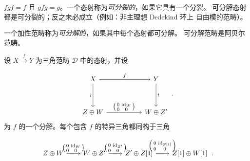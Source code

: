 \clearpage
{}%
\begingroup
\small
\setlength{\abovedisplayskip}{4pt plus 2pt minus 2pt}%
\setlength{\belowdisplayskip}{4pt plus 2pt minus 2pt}%

$fgf=f$ 且 $gfg=g$。一个态射称为\emph{可分裂的}，如果它具有一个分裂。
可分解态射都是可分裂的；反之未必成立（例如：非主理想 Dedekind 环上
自由模的范畴）。

一个加性范畴称为\emph{可分解的}，如果其中每个态射都可分解。
可分解范畴是阿贝尔范畴。

设 $X\xrightarrow{f}Y$ 为三角范畴 $\mathcal D$ 中的态射，并设

\begin{equation*}
  \begin{tikzcd}[ampersand replacement=\&,column sep=5.2em,row sep=3.4em]
    X \arrow[r,"f"] \arrow[d,"\wr"']
      \& Y \arrow[d,"\wr"] \\
    Z\oplus W
      \arrow[r,"{\left(\begin{smallmatrix}0&\operatorname{id}_W\\0&0\end{smallmatrix}\right)}"]
      \& W\oplus Z'
  \end{tikzcd}\,.
\end{equation*}
为 $f$ 的一个分解。每个包含 $f$ 的特异三角都同构于三角

\begin{equation*}
  \begin{tikzcd}[ampersand replacement=\&,column sep=2.0em]
    Z\oplus W
      \arrow[r,"{\left(\begin{smallmatrix}0&\operatorname{id}_W\\0&0\end{smallmatrix}\right)}"]
      \& W\oplus Z'
      \arrow[r,"{\left(\begin{smallmatrix}0&\operatorname{id}_{Z'}\\0&0\end{smallmatrix}\right)}"]
      \& Z'\oplus Z[1]
      \arrow[r,"{\left(\begin{smallmatrix}0&\operatorname{id}_{Z[1]}\\0&0\end{smallmatrix}\right)}"]
      \& Z[1]\oplus W[1]
  \end{tikzcd}\,.
\end{equation*}

